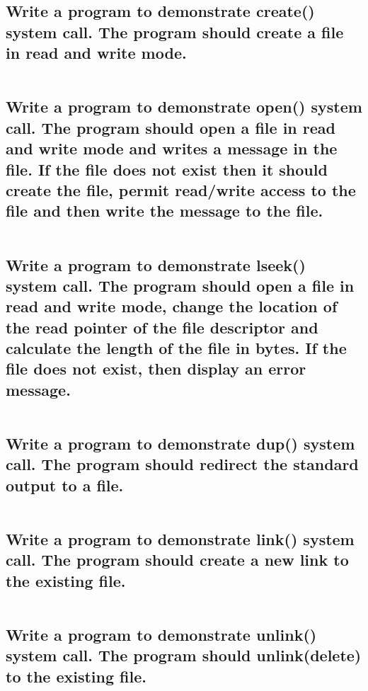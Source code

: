 \subsection{Write a program to demonstrate create() system call.
The program should create a file in read and write mode.}
\inputminted[breaklines, linenos]{c}{9-10-2020/01.c}

\subsection{Write a program to demonstrate open() system call.
The program should open a file in read and write mode and writes a
message in the file. If the file does not exist then it should create the
file, permit read/write access to the file and then write the message
to the file.}
\inputminted[breaklines, linenos]{c}{9-10-2020/02.c}

\subsection{Write a program to demonstrate lseek() system call.
The program should open a file in read and write mode, change the
location of the read pointer of the file descriptor and calculate the
length of the file in bytes. If the file does not exist, then display an
error message.}
\inputminted[breaklines, linenos]{c}{9-10-2020/03.c}

\subsection{Write a program to demonstrate dup() system call.
The program should redirect the standard output to a file.}
\inputminted[breaklines, linenos]{c}{9-10-2020/04.c}

\subsection{Write a program to demonstrate link() system call.
The program should create a new link to the existing file.}
\inputminted[breaklines, linenos]{c}{9-10-2020/05.c}

\subsection{Write a program to demonstrate unlink() system call.
The program should unlink(delete) to the existing file.}
\inputminted[breaklines, linenos]{c}{9-10-2020/06.c}